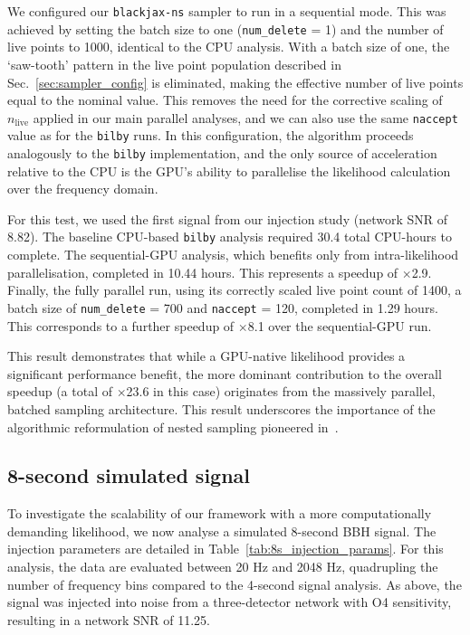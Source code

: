 \documentclass[fleqn,usenatbib]{mnras}
\begin{document}
We configured our \texttt{blackjax-ns} sampler to run in a sequential
mode. This was achieved by setting the batch size to one
(\texttt{num\_delete} = 1) and the number of live points to 1000,
identical to the CPU analysis. With a batch size of one, the
`saw-tooth' pattern in the live point population described in
Sec.~\ref{sec:sampler_config} is eliminated, making the effective
number of live points equal to the nominal value. This removes the need
for the corrective scaling of $n_{\text{live}}$ applied in our main
parallel analyses, and we can also use the same \texttt{naccept}
value as for the \texttt{bilby} runs. In this configuration, the algorithm proceeds
analogously to the \texttt{bilby} implementation, and the only source of
acceleration relative to the CPU is the GPU's ability to parallelise the
likelihood calculation over the frequency domain.

For this test, we used the first signal from our injection study (network
SNR of 8.82). The baseline CPU-based \texttt{bilby} analysis required
30.4 total CPU-hours to complete. The sequential-GPU analysis, which
benefits only from intra-likelihood parallelisation, completed in
10.44 hours. This represents a speedup of $\times$2.9. Finally, the
fully parallel run, using its correctly scaled live point count of 1400,
a batch size of \texttt{num\_delete} = 700 and {\texttt{naccept} = 120}, completed in 1.29 hours.
This corresponds to a further speedup of $\times$8.1 over the
sequential-GPU run.

This result demonstrates that while a GPU-native likelihood provides
a significant performance benefit, the more dominant contribution to the
overall speedup (a total of $\times$23.6 in this case) originates from the
massively parallel, batched sampling architecture. This result
underscores the importance of the algorithmic reformulation 
of nested sampling pioneered in~\cite{yallup2025nested}.


\subsection{8-second simulated signal}
\label{sec:8s_simulated_signal}

To investigate the scalability of our framework with a more
computationally demanding likelihood, we now analyse a simulated
8-second BBH signal. The injection parameters are detailed in
Table~\ref{tab:8s_injection_params}. For this analysis, the data are
evaluated between 20 Hz and 2048 Hz, quadrupling the number of
frequency bins compared to the 4-second signal analysis. As above, the signal was
injected into noise from a three-detector network with O4 sensitivity,
resulting in a network SNR of 11.25.
\end{document}
